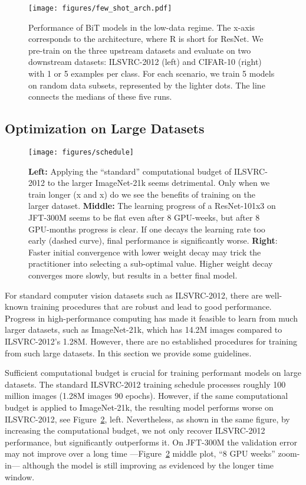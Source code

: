 \documentclass[runningheads]{llncs}
\newcommand{\imagenet}{{ILSVRC-2012}}
\begin{document}
\begin{figure}[t]
\centering
\texttt{[image: figures/few\_shot\_arch.pdf]}
\caption{Performance of BiT models in the low-data regime. 
The x-axis corresponds to the architecture, where R is short for ResNet.
We pre-train on the three upstream datasets and evaluate on two downstream datasets: ILSVRC-2012 (left) and CIFAR-10 (right) with 1 or 5 examples per class.
For each scenario, we train 5 models on random data subsets, represented by the lighter dots.
The line connects the medians of these five runs. 
}
\label{fig:few_shot_arch}
\end{figure}

\subsection{Optimization on Large Datasets}
\label{sec:schedule}

\begin{figure}[t]
\centering
\texttt{[image: figures/schedule]}
\caption{
\textbf{Left:} Applying the ``standard'' computational budget of \imagenet{} to the larger ImageNet-21k seems detrimental.
Only when we train longer (x and x) do we see the benefits of training on the larger dataset.
\textbf{Middle:} The learning progress of a ResNet-101x3 on JFT-300M seems to be flat even after 8 GPU-weeks, but after 8 GPU-months progress is clear. If one decays the learning rate too early (dashed curve), final performance is significantly worse.
\textbf{Right}: Faster initial convergence with lower weight decay may trick the practitioner into selecting a sub-optimal value. Higher weight decay converges more slowly, but results in a better final model.
}
\label{fig:schedule}
\end{figure}

For standard computer vision datasets such as \imagenet{}, there are well-known training procedures that are robust and lead to good performance.
Progress in high-performance computing has made it feasible to learn from much larger datasets, such as ImageNet-21k, which has 14.2M images compared to \imagenet{}'s 1.28M. 
However, there are no established procedures for training from such large datasets. 
In this section we provide some guidelines.

Sufficient computational budget is crucial for training performant models on large datasets. The standard \imagenet{} training schedule processes roughly 100 million images (1.28M images  90 epochs).
However, if the same computational budget is applied to ImageNet-21k, the resulting model performs worse on \imagenet{}, see Figure~\ref{fig:schedule}, left.
Nevertheless, as shown in the same figure, by increasing the computational budget, we not only recover \imagenet{} performance, but significantly outperforms it.
On JFT-300M the validation error may not improve over a long time ---Figure~\ref{fig:schedule} middle plot, ``8 GPU weeks'' zoom-in--- although the model is still improving as evidenced by the longer time window.
\end{document}
